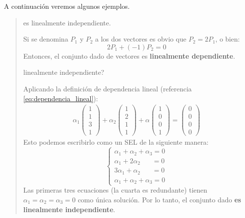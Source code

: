 A continuación veremos algunos ejemplos.
\vspace{5mm}

\begin{quote}
   es linealmente independiente.
  
  Si se denomina \(P_1\) y \(P_2\) a los dos vectores es obvio que \(P_2 = 2P_1\), o bien:
  \[
    2P_1 + (-1)P_2 = 0
  \]
  Entonces, el conjunto dado de vectores es \textbf{linealmente dependiente}.
  
  \vspace{5mm}

   linealmente independiente?

  Aplicando la definición de dependencia lineal (referencia \ref{eq:dependencia_lineal}):
  \begin{align*}
    \alpha_1 \begin{pmatrix}
      1 \\ 1 \\ 3 \\ 1
    \end{pmatrix} + \alpha_2 \begin{pmatrix}
      1 \\ 2 \\ 1 \\ 1
    \end{pmatrix} + \alpha \begin{pmatrix}
      1 \\ 0 \\ 0 \\ 1
    \end{pmatrix} = \begin{pmatrix}
      0 \\ 0 \\ 0 \\ 0
    \end{pmatrix}
  \end{align*}
  Esto podemos escribirlo como un SEL de la siguiente manera:
  \[
    \begin{cases}
      \alpha_1 + \alpha_2 + \alpha_3 = 0 \\
      \alpha_1 + 2\alpha_2 \phantom{+ a_3} = 0 \\
      3\alpha_1 + \alpha_2 \phantom{+ a_3} = 0 \\
      \alpha_1 + \alpha_2 + \alpha_3 = 0
    \end{cases}
  \]
  Las primeras tres ecuaciones (la cuarta es redundante) tienen \(\alpha_1 = \alpha_2 = \alpha_3 = 0\) como única solución. Por lo tanto, el conjunto dado \textbf{es linealmente independiente}. 
\end{quote}

